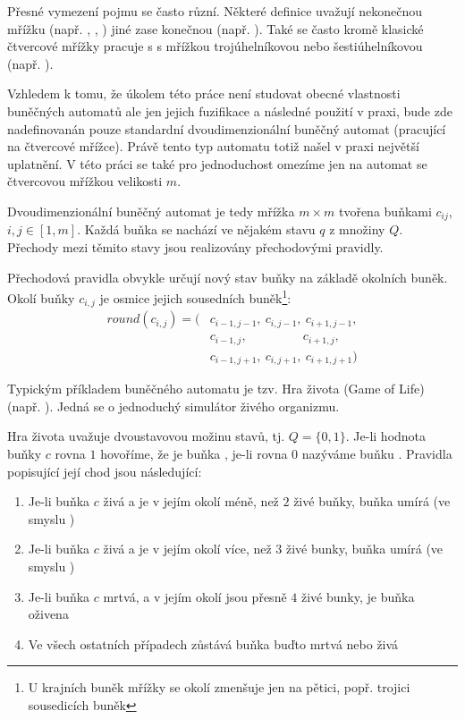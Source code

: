 \documentclass[a4paper,10pt]{article}
\begin{document}
Přesné vymezení pojmu  se často různí. Některé definice uvažují nekonečnou mřížku (např. \cite{Wol-NewKiSci}, \cite{Wol-CelAut}, \cite{BatXie-CellCity})
jiné zase konečnou (např. \cite{Wu-ExpGenPolUrbGroCelAutCit}). Také se často kromě klasické čtvercové mřížky pracuje s s mřížkou trojúhelníkovou nebo šestiúhelníkovou (např. \cite{For-FuzCelAutConjNormForm}).

Vzhledem k tomu, že úkolem této práce není studovat obecné vlastnosti buněčných automatů ale jen jejich fuzifikace a následné použití v praxi, bude zde nadefinovanán pouze standardní dvoudimenzionální buněčný automat (pracující na čtvercové mřížce). Právě tento typ automatu totiž našel v praxi největší uplatnění. V této práci se také pro jednoduchost omezíme jen na automat se čtvercovou mřížkou velikosti $m$.

Dvoudimenzionální buněčný automat je tedy mřížka $m \times m$ tvořena buňkami $c_{ij}$, $i, j \in [1,m]$. Každá buňka se nachází ve nějakém stavu $q$ z množiny $Q$. Přechody mezi těmito stavy jsou realizovány přechodovými pravidly. 

Přechodová pravidla obvykle určují nový stav buňky na základě okolních buněk. Okolí buňky $c_{i,j}$ je osmice jejich sousedních buněk\footnote{U krajních buněk mřížky se okolí zmenšuje jen na pětici, popř. trojici sousedicích buněk}:
\begin{align*}
 round(c_{i,j}) = (
  & c_{i-1, j-1},\ 	c_{i, j-1},\ 	c_{i+1, j-1},	\\
  & c_{i-1, j  },\ 	\qquad \qquad\ 	c_{i+1, j  },	\\
  & c_{i-1, j+1},\ 	c_{i, j+1},\ 	c_{i+1, j+1}	
 )
\end{align*}

\begin{example} \label{ex:GameOfLife}
  Typickým příkladem buněčného automatu je tzv. Hra života (Game of Life) (např. \cite{TofMar-CelAuMach+}). Jedná se o jednoduchý simulátor živého organizmu. 
  
  Hra života uvažuje dvoustavovou možinu stavů, tj. $Q = \{ 0, 1 \}$. Je-li hodnota buňky $c$ rovna $1$ hovoříme, že je buňka , je-li rovna $0$ nazýváme buňku . Pravidla popisující její chod jsou následující:
  \begin{enumerate}
   \item Je-li buňka $c$ živá a je v jejím okolí méně, než $2$ živé buňky, buňka umírá (ve smyslu )
   \item Je-li buňka $c$ živá a je v jejím okolí více, než $3$ živé bunky, buňka umírá (ve smyslu )
   \item Je-li buňka $c$ mrtvá, a v jejím okolí jsou přesně $4$ živé bunky, je buňka oživena
   \item Ve všech ostatních případech zůstává buňka buďto mrtvá nebo živá 
  \end{enumerate}
\end{example}
\end{document}
